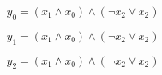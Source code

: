 \documentclass{scrartcl}
\begin{document}
	
\begin{equation}
	y_0 = (x_1 \wedge x_0) \wedge ( \lnot x_2 \lor x_2)
\end{equation}

\begin{equation}
	y_1 = (x_1 \wedge x_0) \wedge ( \lnot x_2 \lor x_2)
\end{equation}

\begin{equation}
	y_2 = (x_1 \wedge x_0) \wedge ( \lnot x_2 \lor x_2)
\end{equation}
\end{document}

